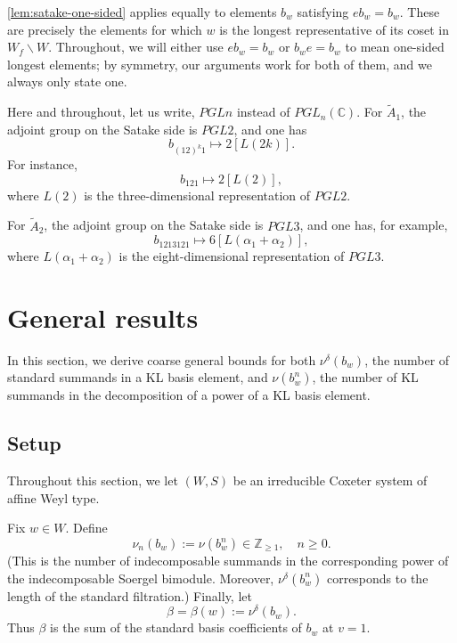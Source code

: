 \documentclass[a4paper,11pt]{amsart}
\newcommand{\C}{\mathbb{C}}
\numberwithin{equation}{subsection}
\theoremstyle{definition}
\theoremstyle{remark}
\begin{document}
\begin{Remark}
\autoref{lem:satake-one-sided} applies equally to elements $b_w$ satisfying
$eb_w=b_w$.
These are precisely the elements for which $w$ is the longest representative
of its coset in
$W_f\backslash W$. Throughout, we will either use $eb_w=b_w$ or $b_we=b_w$ to mean one-sided longest elements; by symmetry, our arguments work for both of them, and we always only state one.
\end{Remark}

\begin{Example}
Here and throughout, let us write, $PGLn$ instead of
$PGL_n(\C)$.
 For $\widetilde{A}_1$, the adjoint group on
the Satake side is $PGL2$, and one has
\[
b_{(12)^k1}
\longmapsto
2[L(2k)].
\]
For instance,
\[
b_{121}
\longmapsto
2[L(2)],
\]
where $L(2)$ is the three-dimensional representation of $PGL2$.

For $\widetilde{A}_2$, the adjoint group on the Satake side is $PGL3$, and one has, for
example,
\[
b_{1213121}
\longmapsto
6[L(\alpha_1+\alpha_2)],
\]
where $L(\alpha_1+\alpha_2)$ is the eight-dimensional representation of
$PGL3$.
\end{Example}

\section{General results}\label{sec:general}

In this section, we derive coarse general bounds for both
$\nu^\delta(b_w)$, the number of standard summands in a KL basis element,
and $\nu(b_w^n)$, the number of KL summands in the decomposition of a power
of a KL basis element.

\subsection{Setup}

Throughout this section, we let $(W,S)$ be an irreducible Coxeter
system of affine Weyl type.

\begin{Definition}
Fix $w\in W$. Define
\[
\nu_n(b_w):=\nu(b_w^n)\in\mathbb{Z}_{\ge 1},
\quad n\geq 0.
\]
(This is the number of indecomposable summands in the corresponding power of
the indecomposable Soergel bimodule. Moreover,
$\nu^\delta(b_w^n)$ corresponds to the length of the standard filtration.) Finally, let
\[
\beta=\beta(w):=\nu^\delta(b_w).
\]
Thus $\beta$ is the sum of the standard basis coefficients of $b_w$ at $v=1$.
\end{Definition}
\end{document}
